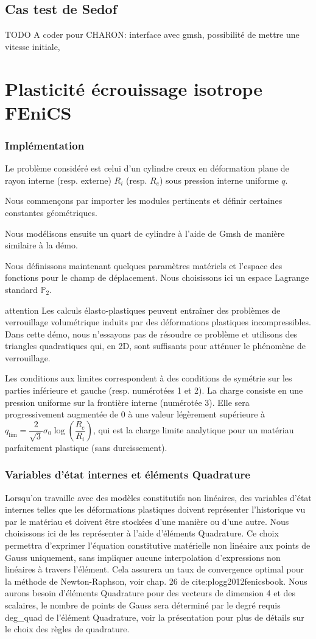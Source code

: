 \documentclass[10pt]{book}
\begin{document}
\subsection{Cas test de Sedof}
TODO
A coder pour CHARON: interface avec gmsh, possibilité de mettre une vitesse initiale, 
\section{Plasticité écrouissage isotrope FEniCS}
\subsubsection{Implémentation}
Le problème considéré est celui d'un cylindre creux en déformation plane de rayon interne (resp. externe) $R_i$ (resp. $R_e$) sous pression interne uniforme $q$.

Nous commençons par importer les modules pertinents et définir certaines constantes géométriques.

Nous modélisons ensuite un quart de cylindre à l'aide de Gmsh de manière similaire à la démo.

Nous définissons maintenant quelques paramètres matériels et l'espace des fonctions pour le champ de déplacement. Nous choisissons ici un espace Lagrange standard $\mathbb{P}_2$.

{attention}
Les calculs élasto-plastiques peuvent entraîner des problèmes de verrouillage volumétrique induits par des déformations plastiques incompressibles. Dans cette démo, nous n'essayons pas de résoudre ce problème et utilisons des triangles quadratiques qui, en 2D, sont suffisants pour atténuer le phénomène de verrouillage.

Les conditions aux limites correspondent à des conditions de symétrie sur les parties inférieure et gauche (resp. numérotées 1 et 2). La charge consiste en une pression uniforme sur la frontière interne (numérotée 3). Elle sera progressivement augmentée de 0 à une valeur légèrement supérieure à $q_\text{lim}=\dfrac{2}{\sqrt{3}}\sigma_0\log\left(\dfrac{R_e}{R_i}\right)$, qui est la charge limite analytique pour un matériau parfaitement plastique (sans durcissement).
\subsubsection{Variables d'état internes et éléments Quadrature}
Lorsqu'on travaille avec des modèles constitutifs non linéaires, des variables d'état internes telles que les déformations plastiques doivent représenter l'historique vu par le matériau et doivent être stockées d'une manière ou d'une autre. Nous choisissons ici de les représenter à l'aide d'éléments Quadrature. Ce choix permettra d'exprimer l'équation constitutive matérielle non linéaire aux points de Gauss uniquement, sans impliquer aucune interpolation d'expressions non linéaires à travers l'élément. Cela assurera un taux de convergence optimal pour la méthode de Newton-Raphson, voir chap. 26 de {cite:p}logg2012fenicsbook. Nous aurons besoin d'éléments Quadrature pour des vecteurs de dimension 4 et des scalaires, le nombre de points de Gauss sera déterminé par le degré requis deg\_quad de l'élément Quadrature, voir la présentation pour plus de détails sur le choix des règles de quadrature.
\end{document}
